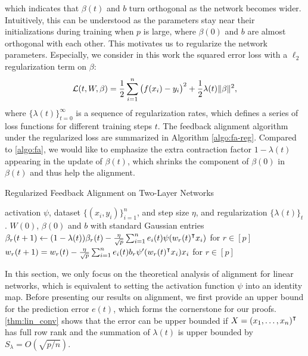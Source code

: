 which indicates that $\beta(t)$ and $b$ turn orthogonal as the network becomes wider. Intuitively, this can be understood as the parameters stay near their initializations during training when $p$ is large, where $\beta(0)$ and $b$ are almost orthogonal with each other. This motivates us to regularize the network parameters. Especially, we consider in this work the squared error loss with a $\ell_2$ regularization term on $\beta$:
\begin{equation}
\label{eqn:loss-with-reg}
\mathcal{L}(t, W, \beta) = \frac{1}{2}\sum_{i=1}^n\big(f(x_i)-y_i\big)^2 + \frac{1}{2}\lambda(t)\|\beta\|^2,
\end{equation}
where $\{\lambda(t)\}_{t=0}^\infty$ is a sequence of regularization rates, which defines a series of loss functions for different training steps $t$. The feedback alignment algorithm under the regularized loss are summarized in Algorithm \ref{algo:fa-reg}. Compared to \cref{algo:fa}, we would like to emphasize the extra contraction factor $1-\lambda(t)$ appearing in the update of $\beta(t)$, which shrinks the component of $\beta(0)$ in $\beta(t)$ and thus help the alignment.

\begin{algorithm}[H]
\centering
\caption{Regularized Feedback Alignment on Two-Layer Networks}\label{algo:fa-reg}
    \begin{algorithmic}[1]
        \Require activation $\psi$, dataset $\{(x_i,y_i)\}_{i=1}^n$, and step size $\eta$, and regularization $\{\lambda(t)\}_t$.
         $W(0)$, $\beta(0)$ and $b$ with standard Gaussian entries
            \State $\beta_r(t+1) \gets (1-\lambda(t))\beta_r(t) - \frac{\eta}{\sqrt p} \sum_{i=1}^n e_i(t)\psi(w_r(t)\transpose x_i)$ for $r\in[p]$
            \State $w_r(t+1) = w_r(t) - \frac{\eta}{\sqrt{p}} \sum_{i=1}^n e_i(t) b_r\psi'(w_r(t)\transpose x_i)x_i$ for $r\in[p]$
        \EndWhile
    \end{algorithmic}    
\end{algorithm}

In this section, we only focus on the theoretical analysis of alignment for linear networks, which is equivalent to setting the activation function $\psi$ into an identity map. Before presenting our results on alignment, we first provide an upper bound for the prediction error $e(t)$, which forms the cornerstone for our proofs. \cref{thm:lin_conv} shows that the error can be upper bounded if $X = (x_1,\ldots,x_n)\transpose$ has full row rank and the summation of $\lambda(t)$ is upper bounded by $S_\lambda = O(\sqrt{p/n})$.

